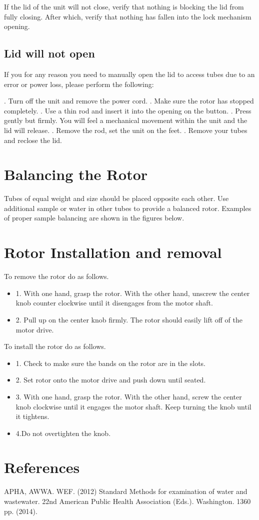 \documentclass[12pt]{../SOP3_beta}
\begin{document}
\NP If the lid of the unit will not close, verify that nothing is blocking the lid from fully closing. After which, verify that nothing has fallen into the lock mechanism opening. 

\subsection*{Lid will not open}

\NP If you for any reason you need to manually open the lid to access tubes due to an error or power loss, please perform the following:

. Turn off the unit and remove the power cord.
. Make sure the rotor has stopped completely.
. Use a thin rod and insert it into the opening on the button.
. Press gently but firmly. You will feel a mechanical movement within the unit and the lid will release.
. Remove the rod, set the unit on the feet.
. Remove your tubes and reclose the lid. 

\section{Balancing the Rotor}

\NP Tubes of equal weight and size should be placed opposite each other. Use additional sample or water in other tubes to provide a balanced rotor. Examples of proper sample balancing are shown in the figures below. 
\section{Rotor Installation and removal}

\NP To remove the rotor do as follows.
\begin{itemize}
  \item 1. With one hand, grasp the rotor. With the other hand, unscrew the center knob counter clockwise until it disengages from the motor shaft.
  \item 2. Pull up on the center knob firmly. The rotor should easily lift off of the motor drive.
\end{itemize}

\NP To install the rotor do as follows.
\begin{itemize}
  \item 1. Check to make sure the bands on the rotor are in the slots.
  \item 2. Set rotor onto the motor drive and push down until seated.
  \item 3. With one hand, grasp the rotor. With the other hand, screw the center knob clockwise until it engages the motor shaft. Keep turning the knob until it tightens.
  \item 4.Do not overtighten the knob.
\end{itemize}


\section{References}

\NP APHA, AWWA. WEF. (2012) Standard Methods for examination of water and wastewater. 22nd American Public Health Association (Eds.). Washington. 1360 pp. (2014).
\end{document}
